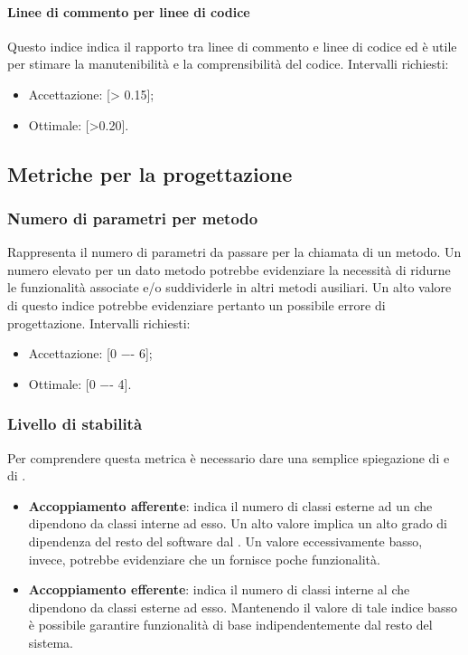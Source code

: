 \paragraph{Linee di commento per linee di codice}
Questo indice indica il rapporto tra linee di commento e linee di codice ed è utile per stimare la manutenibilità e la comprensibilità del codice. 
Intervalli richiesti:
\begin{itemize}
\item
Accettazione: [> 0.15];
\item
Ottimale: [>0.20].
\end{itemize}

\subsection{Metriche per la progettazione}

\subsubsection{Numero di parametri per metodo}
Rappresenta il numero di parametri da passare per la chiamata di un metodo.
Un numero elevato per un dato metodo potrebbe evidenziare la necessità di ridurne le funzionalità associate e/o suddividerle in altri metodi ausiliari.
Un alto valore di questo indice potrebbe evidenziare pertanto un possibile errore di progettazione.
Intervalli richiesti:
\begin{itemize}
\item
Accettazione: [0 −- 6];
\item
Ottimale: [0 −- 4].
\end{itemize}

\subsubsection{Livello di stabilità}
Per comprendere questa metrica è necessario dare una semplice spiegazione di  e di .
\begin{itemize}
\item
\textbf{Accoppiamento afferente}: indica il numero di classi esterne ad un  che dipendono da classi interne ad esso.
Un alto valore implica un alto grado di dipendenza del resto del software dal . Un valore eccessivamente basso, invece, potrebbe evidenziare che un  fornisce poche funzionalità.
\item
\textbf{Accoppiamento efferente}: indica il numero di classi interne al  che dipendono da classi esterne ad esso.
Mantenendo il valore di tale indice basso è possibile garantire funzionalità di base indipendentemente dal resto del sistema.
\end{itemize}


